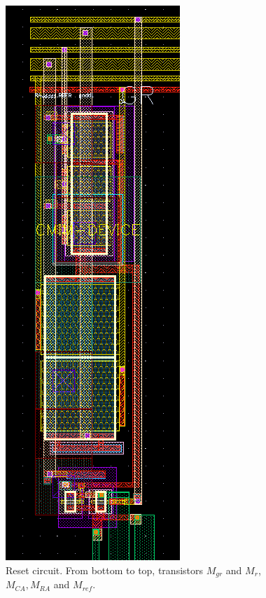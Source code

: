 \begin{figure}
	\center
	\includegraphics{pixel4.png}
	\caption{Reset circuit. From bottom to top, transistors $M_{gr}$ and $M_{r}$, $M_{CA}, M_{RA}$ and $M_{ref}$.}
	\label{cuatro}
\end{figure}
